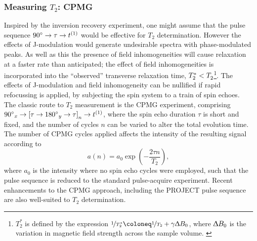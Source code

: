 \subsubsection{Measuring $T_2$: \acs{CPMG}}
\label{subsec:cpmg}
Inspired by the inversion recovery experiment, one might assume
that the pulse sequence $\ang{90} \rightarrow \tau \rightarrow t^{(1)}$ would be
effective for  $T_2$ determination. However the effects of J-modulation would
generate undesirable spectra with phase-modulated peaks. As well as this the
presence of field inhomogeneities will cause relaxation at a faster rate than
anticipated; the effect of field inhomogeneities is incorporated into the
``observed'' transverse relaxation time, $T_2^* < T_2^{\vphantom{*}}$\footnote{
    $T_2^*$ is defined by the expression
    $\nicefrac{1}{T_2^*} \coloneq \nicefrac{1}{T_2} + \gamma \Updelta B_0$,
    where $\Updelta B_0$ is the variation in magnetic field strength across the
    sample volume.
    \label{fn:t2-star}
}\cite{Chavhan2009}. The effects of
J-modulation and field inhomogeneity can be nullified if rapid refocussing is
applied, by subjecting the spin system to a train of spin echoes. The classic
route to $T_2$ measurement is the \ac{CPMG}
experiment\cite{Carr1954,Meiboom1958}, comprising $\ang{90}_x \rightarrow
\left[ \tau \rightarrow \ang{180}_y \rightarrow \tau \right]_n \rightarrow
t^{(1)}$, where the spin echo duration $\tau$ is short and fixed, and the number
of cycles $n$ can be varied to alter the total evolution time. The number of
\ac{CPMG} cycles applied affects the intensity of the resulting signal
according to
\begin{equation}
    a(n) = a_0 \exp\left(-\frac{2 \tau n}{T_2}\right),
\end{equation}
where $a_0$ is the intensity where no spin echo cycles were employed, such that
the pulse sequence is reduced to the standard pulse-acquire experiment. Recent
enhancements to the \ac{CPMG} approach, including the \ac{PROJECT} pulse
sequence\cite{Aguilar2012} are also well-suited to $T_2$ determination.

